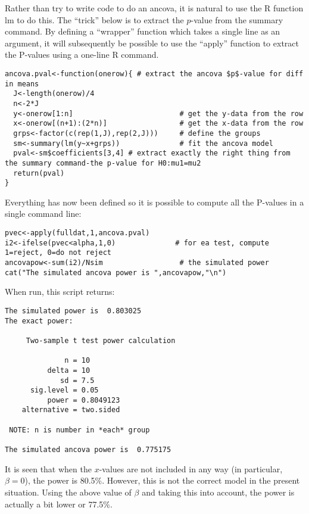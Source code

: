 \documentclass[12pt,a4paper]{article}
\theoremstyle{regla}
\theoremstyle{remark}
\theoremstyle{definition}
\theoremstyle{nonumberbreak}
\begin{document}
\begin{xmpl}
Rather than try to write code to do an ancova, it is natural to use the R function lm to do this.  The ``trick'' below is to extract the $p$-value from the summary command.  By defining a ``wrapper'' function which takes a single line as an argument, it will subsequently be possible to use the ``apply'' function to extract the P-values using a one-line R command.

\begin{lstlisting}
ancova.pval<-function(onerow){ # extract the ancova $p$-value for diff in means
  J<-length(onerow)/4
  n<-2*J
  y<-onerow[1:n]                         # get the y-data from the row
  x<-onerow[(n+1):(2*n)]                 # get the x-data from the row
  grps<-factor(c(rep(1,J),rep(2,J)))     # define the groups
  sm<-summary(lm(y~x+grps))              # fit the ancova model
  pval<-sm$coefficients[3,4] # extract exactly the right thing from the summary command-the p-value for H0:mu1=mu2
  return(pval)
}
\end{lstlisting}
Everything has now been defined so it is possible to compute all the P-values in a single command line:
\begin{lstlisting}
pvec<-apply(fulldat,1,ancova.pval)
i2<-ifelse(pvec<alpha,1,0)              # for ea test, compute 1=reject, 0=do not reject
ancovapow<-sum(i2)/Nsim                  # the simulated power
cat("The simulated ancova power is ",ancovapow,"\n")
\end{lstlisting}

When run, this script returns:
\begin{lstlisting}
The simulated power is  0.803025 
The exact power:

     Two-sample t test power calculation 

              n = 10
          delta = 10
             sd = 7.5
      sig.level = 0.05
          power = 0.8049123
    alternative = two.sided

 NOTE: n is number in *each* group 

The simulated ancova power is  0.775175 
\end{lstlisting}

It is seen that when the $x$-values are not included in any way (in particular, $\beta=0$), the power is 80.5\%.  However, this is not the correct model in the present situation.  Using the above value of $\beta$ and taking this into account, the power is actually a bit lower or 77.5\%.

\end{xmpl}
\end{document}
